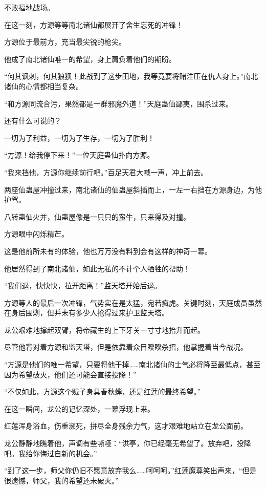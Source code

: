 
\begin{this_body}

不败福地战场。

在这一刻，方源等等南北诸仙都展开了舍生忘死的冲锋！

方源位于最前方，充当最尖锐的枪尖。

他成了南北诸仙唯一的希望，身上肩负着他们的期盼。

“何其讽刺，何其狼狈！此战到了这步田地，我等竟要将赌注压在仇人身上。”南北诸仙的心情都相当复杂。

“和方源同流合污，果然都是一群邪魔外道！”天庭蛊仙鄙夷，围杀过来。

还有什么可说的？

一切为了利益，一切为了生存，一切为了胜利！

“方源！给我停下来！”一位天庭蛊仙扑向方源。

“我来挡他，方源你继续前行吧。”百足天君大喊一声，冲上前去。

两座仙蛊屋冲撞过来，南北诸仙的仙蛊屋斜插而上，一左一右挡在方源身边，为他护驾。

八转蛊仙火并，仙蛊屋像是一只只的蛮牛，只来得及对撞。

方源眼中闪烁精芒。

这是他前所未有的体验，他也万万没有料到会有这样的神奇一幕。

他居然得到了南北诸仙，如此无私的不计个人牺牲的帮助！

“我们退，快快快，拉开距离！”监天塔开始后退。

方源等人的最后一次冲锋，气势实在是太猛，宛若疯虎。关键时刻，天庭成员虽然在身后围剿，但并未有多少人抢得过来护卫监天塔。

龙公艰难地撑起双臂，将帝藏生的上下牙关一寸寸地抬升而起。

尽管他背对着方源和监天塔，但是依靠着众目睽睽杀招，他掌握着当今战况。

“方源是他们的唯一希望，只要将他干掉……南北诸仙的士气必将降至最低点，甚至因为希望破灭，他们还可能会直接投降！”

“不仅如此，方源这个贼子身具春秋蝉，还是红莲的最终希望。”

在这一瞬间，龙公的记忆深处，一幕浮现上来。

红莲浑身浴血，伤重濒死，拼尽全身残余力气，这才艰难地站立在龙公面前。

龙公静静地瞧着他，声调有些嘶哑：“洪亭，你已经毫无希望了。放弃吧，投降吧。我给你悔过自新的机会。”

“到了这一步，师父你仍旧不愿意放弃我么……呵呵呵。”红莲魔尊笑出声来，“但是很遗憾，师父，我的希望还未破灭。”


\end{this_body}
